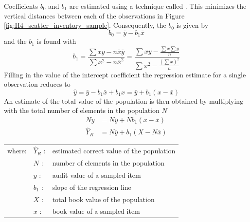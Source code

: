 Coefficients $b_0$ and $b_1$ are estimated using a technique called . This minimizes the vertical distances between each of the observations in Figure \ref{fig:H4_scatter_inventory_sample}. Consequently, the  $b_0$ is given by
\begin{equation}
b_0 = \bar{y} - b_1 \bar{x}
\label{eq:regression_intercept}
\end{equation}
and the  $b_1$ is found with
\begin{equation}
b_1 = \frac{\sum{xy - n \bar{x} \bar{y}}}{\sum{x^2} - n \bar{x}^2} 
 = \frac{\sum{x y} - \frac{\sum{x}\sum{y}}{n}}{\sum{x^2} - \frac{(\sum{x})^2}{n}}
\label{eq:regression_slope}
\end{equation}
Filling in the value of the intercept coefficient the regression estimate for a single observation reduces to
\begin{equation*}
\hat{y} = \bar{y} - b_1 \bar{x} + b_1 x = \bar{y} + b_1(x - \bar{x})
\label{eq:regression_estimate_single}
\end{equation*} 
An estimate of the total value of the population is then obtained by multiplying with the total number of elements in the population $N$
\begin{align}
N \hat{y} &= N \bar{y} + N b_1(x - \bar{x}) \\
\hat{Y}_R &= N \overline{y} + b_1 (X - N \overline{x})
\label{eq:regression_estimate}
\end{align}

\noindent
\begin{tabularx}{\textwidth}{@{}llX@{}}
where: & $\hat{Y}_R$ : & estimated correct value of the population\\
       & $N$         : & number of elements in the population\\
       & $y$         : & audit value of a sampled item\\
       & $b_1$       : & slope of the regression line\\
       & $X$         : & total book value of the population\\
       & $x$         : & book value of a sampled item\\
\end{tabularx}

